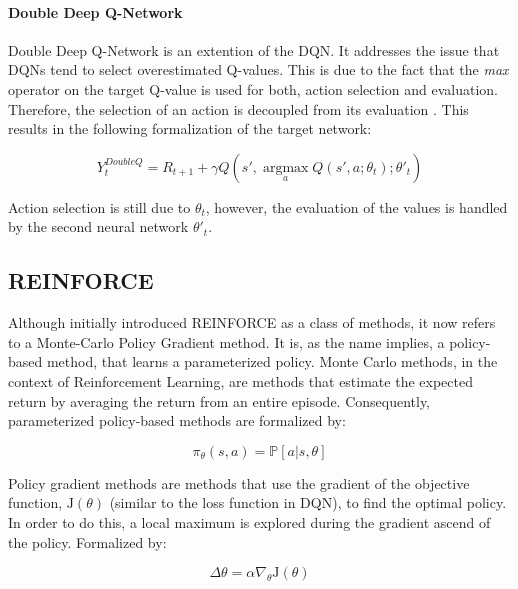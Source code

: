\paragraph{Double Deep Q-Network}
\label{para:ddqn}
Double Deep Q-Network is an extention of the DQN. It addresses the issue that DQNs tend to select overestimated Q-values. This is due to the fact that the \textit{max} operator on the target Q-value is used for both, action selection and evaluation. Therefore, the selection of an action is decoupled from its evaluation \cite{van2016deep}. This results in the following formalization of the target network:

\begin{equation}
Y_{t}^{DoubleQ} = R_{t+1} + \gamma Q(s', \operatorname*{argmax}_a Q(s', a; \theta_{t}); \theta'_{t})
\label{eq:ddqn_target}
\end{equation}

Action selection is still due to $\theta_t$, however, the evaluation of the values is handled by the second neural network $\theta'_t$.




\subsection{REINFORCE}
\label{ssec:reinforce}
Although  initially introduced REINFORCE as a class of methods, it now refers to a Monte-Carlo Policy Gradient method. It is, as the name implies, a policy-based method, that learns a parameterized policy. Monte Carlo methods, in the context of Reinforcement Learning, are methods that estimate the expected return by averaging the return from an entire episode. Consequently, parameterized policy-based methods are formalized by:

\begin{equation}
\pi_{\theta}(s,a) = \mathbb{P} [a | s, \theta]
\label{eq:policy_parameterized}
\end{equation}

Policy gradient methods are methods that use the gradient of the objective function, $\mathrm{J}(\theta)$ (similar to the loss function in DQN), to find the optimal policy. In order to do this, a local maximum is explored during the gradient ascend of the policy. Formalized by:

\begin{equation}
\Delta \theta = \alpha \nabla_{\theta} \mathrm{J}(\theta)
\label{eq:policy_gradient_descent}
\end{equation}

